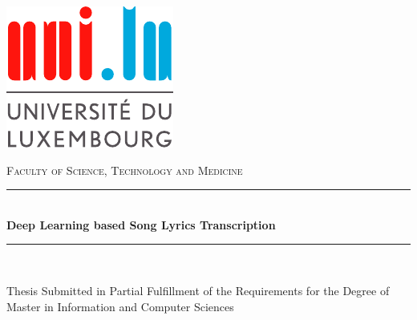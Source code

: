 \newcommand{\HRule}{\rule{\linewidth}{0.5mm}}

\begin{titlepage}

\begin{center}

\includegraphics{00-frontmatter/unilogo.pdf}

\vspace{1cm}

\textsc{\Large Faculty of Science, Technology and Medicine}\\[1.0cm]

\vspace{1cm}

\HRule \\[0.4cm]
{\huge \bfseries Deep Learning based Song Lyrics Transcription}\\
\HRule \\[1.5cm]


\begin{minipage}{0.8\textwidth}
\begin{center}
{\Large Thesis Submitted in Partial Fulfillment of the Requirements
for the Degree of Master in Information and Computer Sciences}
\end{center}
\end{minipage}


\end{center}
\end{titlepage}
